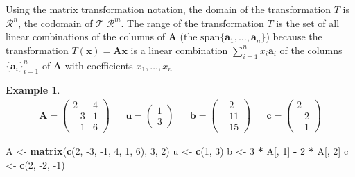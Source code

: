 \documentclass[
]{book}
\newenvironment{Shaded}{\begin{snugshade}}{\end{snugshade}}
\newcommand{\DecValTok}[1]{\textcolor[rgb]{0.00,0.00,0.81}{#1}}
\newcommand{\KeywordTok}[1]{\textcolor[rgb]{0.13,0.29,0.53}{\textbf{#1}}}
\newcommand{\NormalTok}[1]{#1}
\newcommand{\OperatorTok}[1]{\textcolor[rgb]{0.81,0.36,0.00}{\textbf{#1}}}
\newcommand{\StringTok}[1]{\textcolor[rgb]{0.31,0.60,0.02}{#1}}
\theoremstyle{definition}
\theoremstyle{definition}
\newtheorem{example}{Example}[chapter]
\theoremstyle{definition}
\theoremstyle{definition}
\theoremstyle{remark}
\begin{document}
Using the matrix transformation notation, the domain of the transformation \(T\) is \(\mathcal{R}^n\), the codomain of \(\mathcal{T}\) \(\mathcal{R}^m\). The range of the transformation \(T\) is the set of all linear combinations of the columns of \(\mathbf{A}\) (the \(\mbox{span}\{\mathbf{a}_1, \ldots, \mathbf{a}_n\}\)) because the transformation \(T(\mathbf{x}) = \mathbf{A} \mathbf{x}\) is a linear combination \(\sum_{i=1}^n x_i \mathbf{a}_i\) of the columns \(\{\mathbf{a}_i\}_{i=1}^n\) of \(\mathbf{A}\) with coefficients \(x_1, \ldots, x_n\)

\begin{example}
\[
\begin{aligned}
\mathbf{A} = \begin{pmatrix}
2 & 4 \\
-3 & 1 \\
-1 & 6
\end{pmatrix}
&& \mathbf{u} = \begin{pmatrix}
1 \\
3
\end{pmatrix}
&& \mathbf{b} = \begin{pmatrix}
-2 \\
-11 \\
-15
\end{pmatrix} &&
\mathbf{c} = \begin{pmatrix}
2 \\
-2 \\
-1
\end{pmatrix}
\end{aligned}
\]

\begin{Shaded}
\begin{Highlighting}[]
\NormalTok{A <-}\StringTok{ }\KeywordTok{matrix}\NormalTok{(}\KeywordTok{c}\NormalTok{(}\DecValTok{2}\NormalTok{, }\DecValTok{-3}\NormalTok{, }\DecValTok{-1}\NormalTok{, }\DecValTok{4}\NormalTok{, }\DecValTok{1}\NormalTok{, }\DecValTok{6}\NormalTok{), }\DecValTok{3}\NormalTok{, }\DecValTok{2}\NormalTok{)}
\NormalTok{u <-}\StringTok{ }\KeywordTok{c}\NormalTok{(}\DecValTok{1}\NormalTok{, }\DecValTok{3}\NormalTok{)}
\NormalTok{b <-}\StringTok{ }\DecValTok{3} \OperatorTok{*}\StringTok{ }\NormalTok{A[, }\DecValTok{1}\NormalTok{] }\OperatorTok{-}\StringTok{ }\DecValTok{2} \OperatorTok{*}\StringTok{ }\NormalTok{A[, }\DecValTok{2}\NormalTok{]}
\NormalTok{c <-}\StringTok{ }\KeywordTok{c}\NormalTok{(}\DecValTok{2}\NormalTok{, }\DecValTok{-2}\NormalTok{, }\DecValTok{-1}\NormalTok{)}
\end{Highlighting}
\end{Shaded}


\end{example}
\end{document}
